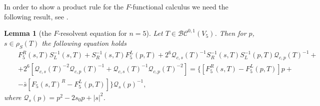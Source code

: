 \documentclass[reqno,11pt]{amsart}
\numberwithin{equation}{section}
\newtheorem{lemma}[theorem]{Lemma}
\theoremstyle{definition}
\begin{document}
In order to show a product rule for the $F$-functional calculus we need the following result, see \cite[Lemma 4.1]{CDS}.
\begin{lemma}[the $F$-resolvent equation for $n=5$]
	\label{reseq}
	Let $T \in \mathcal{BC}^{0,1}(V_5)$. Then for $p$, $s \in \rho_S(T)$ the following equation holds
	\begin{eqnarray*}
		&&F_5^R(s,T)S^{-1}_L(s,T)+S^{-1}_R(s,T) F_5^L(p,T)+2^6 \mathcal{Q}_{c,s}(T)^{-1}S^{-1}_R(s,T) S^{-1}_{L}(p,T) \mathcal{Q}_{c,p}(T)^{-1}+\\
		&&+2^{6}[ \mathcal{Q}_{c,s}(T)^{-2} \mathcal{Q}_{c,p}(T)^{-1}+ \mathcal{Q}_{c,s}(T)^{-1} \mathcal{Q}_{c,p}(T)^{-2}]= \{ [F_{5}^R(s,T)- F_5^{L}(p,T)]p+\\
		&&- \bar{s}[F_5(s,T)^R-F_5^{L}(p,T)]\} \mathcal{Q}_s(p)^{-1},
	\end{eqnarray*}
	where $ \mathcal{Q}_s(p)=p^2-2s_0p+|s|^2$.
\end{lemma}
\end{document}
